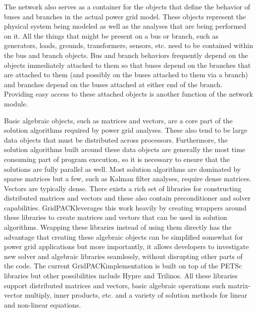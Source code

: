 \documentclass[preprint]{acm_proc_article-sp}
\begin{document}
The network also serves as a container for the objects that define the behavior
of buses and branches in the actual power grid model. These objects represent
the physical system being modeled as well as the analyses that are being
performed on it. All the things that might be present on a bus or branch,
such as generators, loads, grounds, transformers, sensors, etc. need to be
contained within the bus and branch objects. Bus and branch behaviors frequently
depend on the objects immediately attached to them so that buses depend on the
branches that are attached to them (and possibly on the buses attached to them
via a branch) and branches depend on the buses attached at either end of the
branch. Providing easy access to these attached objects is another function of the
network module.

Basic algebraic objects, such as matrices and vectors, are a core part
of the solution algorithms required by power grid analyses. These also tend to
be large data objects that must be distributed across processors. Furthermore,
the solution algorithms built around these data objects are generally the most
time consuming part of program execution, so it is necessary to ensure that the
solutions are fully parallel as well. Most solution algorithms
are dominated by sparse matrices but a few, such as Kalman filter
analyses\cite{KAL}, require dense
matrices. Vectors are typically dense. There exists a rich set of libraries for
constructing distributed matrices and vectors and these also contain preconditioner
and solver capabilities.  GridPACK\texttrademark leverages this work heavily by
creating wrappers
around these libraries to create matrices and vectors that can be used in solution
algorithms. Wrapping these libraries instead of using them directly has the
advantage that creating these algebraic objects can be simplified somewhat for power grid
applications but more importantly, it allows developers to investigate new
solver and algebraic libraries seamlessly, without disrupting other parts of the code.
The current GridPACK\texttrademark implementation is built on top of the
PETSc\cite{PETSC}
libraries but other possibilities include Hypre\cite{HYPRE} and
Trilinos\cite{TRIL}. All these
libraries support distributed matrices and vectors, basic algebraic operations
such matrix-vector multiply, inner products, etc. and a variety of solution
methods for linear and non-linear equations.
\end{document}
